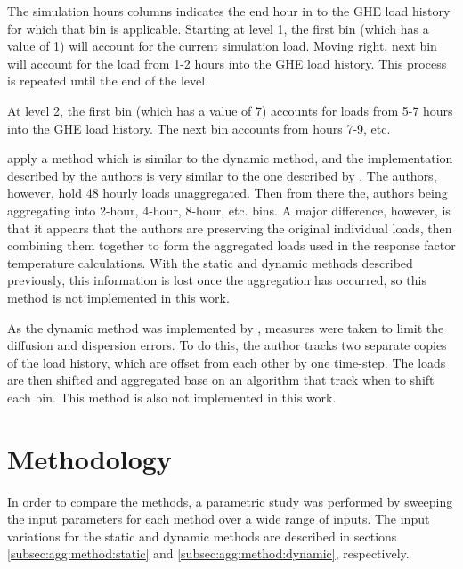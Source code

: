 \documentclass[review,12pt]{elsarticle}
\begin{document}
The simulation hours columns indicates the end hour in to the GHE load history for which that bin is applicable. Starting at level 1, the first bin (which has a value of 1) will account for the current simulation load. Moving right, next bin will account for the load from 1-2 hours into the GHE load history. This process is repeated until the end of the level.

At level 2, the first bin (which has a value of 7) accounts for loads from 5-7 hours into the GHE load history. The next bin accounts from hours 7-9, etc.

\cite{MARCOTTE2008651} apply a method which is similar to the dynamic method, and the implementation described by the authors is very similar to the one described by \cite{ClaessonJaved2012}. The authors, however, hold 48 hourly loads unaggregated. Then from there the, authors being aggregating into 2-hour, 4-hour, 8-hour, etc. bins. A major difference, however, is that it appears that the authors are preserving the original individual loads, then combining them together to form the aggregated loads used in the response factor temperature calculations. With the static and dynamic methods described previously, this information is lost once the aggregation has occurred, so this method is not implemented in this work.

As the dynamic method was implemented by \cite{Wentzel2005}, measures were taken to limit the diffusion and dispersion errors. To do this, the author tracks two separate copies of the load history, which are offset from each other by one time-step. The loads are then shifted and aggregated base on an algorithm that track when to shift each bin. This method is also not implemented in this work.

\section{Methodology}

In order to compare the methods, a parametric study was performed by sweeping the input parameters for each method over a wide range of inputs. The input variations for the static and dynamic methods are described in sections \ref{subsec:agg:method:static} and \ref{subsec:agg:method:dynamic}, respectively.
\end{document}

